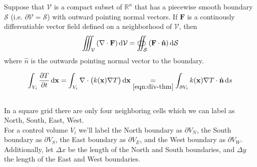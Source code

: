 \documentclass[final]{beamer}
\begin{document}
\begin{frame}
\end{frame}

\begin{frame}
	\begin{theorem}
		Suppose that $\mathcal{V}$ is a compact subset of $\mathbb{R}^n$ that has a piecewise smooth boundary $\mathcal{S}$ (i.e. $\partial\mathcal{V}=\mathcal{S}$) with outward pointing normal vectors. If $\mathbf{F}$ is a continously differentiable vector field defined on a neighborhood of $\mathcal{V}$, then
		\begin{equation}
			\iiint_{\mathcal{V}}\left(\nabla\cdot\mathbf{F}\right)\dif\mathcal{V}=\oiint_{\mathcal{S}}\left(\mathbf{F}\cdot\mathbf{\hat{n}}\right)\dif\mathcal{S}\label{eqn:div-thm}
		\end{equation}
		where $\hat{n}$ is the outwards pointing normal vector to the boundary.
		\label{thm:div-thm}
	\end{theorem}
\end{frame}

\begin{frame}
	\begin{equation}
		\int_{V_i}\frac{\partial T}{\partial t}\dif\mathbf{x}=\int_{V_i}\nabla\cdot \left(k(\mathbf{x})\nabla T\right)\dif\mathbf{x}\underset{\eqref{eqn:div-thm}}{=}\int_{\partial V_i}k(\mathbf{x})\nabla T\cdot\hat{\mathbf{n}}\dif s\label{eqn:Vol-to-Surface-FVM}
	\end{equation}\\
	\vspace{1em}
	In a square grid there are only four neighboring cells which we can label as North, South, East, West.\\\vspace{1em}
	For a control volume $V_i$ we'll label the North boundary as $\partial V_N$, the South boundary as $\partial V_S$, the East boundary as $\partial V_E$, and the West boundary as $\partial V_W$.\\\vspace{1em}
	Additionally, let $\Delta x$ be the length of the North and South boundaries, and $\Delta y$ the length of the East and West boundaries.
\end{frame}
\end{document}
